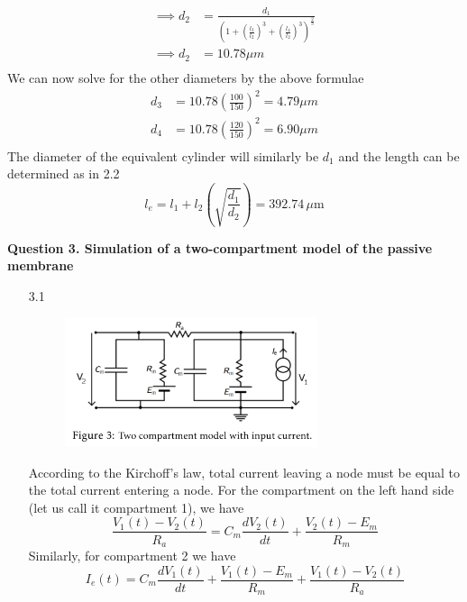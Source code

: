 \documentclass[12pt]{article}
\begin{document}
\begin{enumerate}
\begin{align*}
        \implies d_{2} &= \frac{d_{1}}{\left(1 + \left(\frac{l_{3}}{l_{2}}\right)^{3} + \left(\frac{l_{4}}{l_{2}}\right)^{3}\right)^{\frac{2}{3}}}\\
        \implies d_{2} &= 10.78 \mu m\\
    \end{align*}
    We can now solve for the other diameters by the above formulae
    \begin{align*}
        d_{3} &= 10.78\left(\frac{100}{150}\right)^{2} = 4.79 \mu m\\
        d_{4} &= 10.78\left(\frac{120}{150}\right)^{2} = 6.90 \mu m\\
    \end{align*}
    The diameter of the equivalent cylinder will similarly be $d_{1}$ and the length can be determined as in 2.2
    $$l_{e} = l_{1} + l_{2}\left(\sqrt{\frac{d_{1}}{d_{2}}}\right) = 392.74 \, \mu \text{m}$$
\end{enumerate}

\noindent\textbf{Question 3. Simulation of a two-compartment model of the passive membrane}
\begin{enumerate}
\item[3.1]
\begin{figure}[h]
    \centering
    \includegraphics[width=0.7\textwidth]{circuit.png}
\end{figure}
According to the Kirchoff's law, total current leaving a node must be equal to the total current entering a node. For the compartment 
on the left hand side (let us call it compartment 1), we have 
$$\frac{V_{1}(t) - V_{2}(t)}{R_{a}} = C_{m}\frac{dV_{2}(t)}{dt} + \frac{V_{2}(t)-E_{m}}{R_m}$$
Similarly, for compartment 2 we have
$$I_{e}(t) = C_{m}\frac{dV_{1}(t)}{dt} + \frac{V_{1}(t)-E_{m}}{R_m} + \frac{V_{1}(t) - V_{2}(t)}{R_{a}}$$
\end{enumerate}
\end{document}

